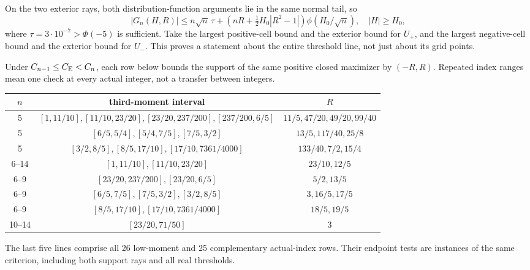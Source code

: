 On the two exterior rays, both distribution-function arguments lie
in the same normal tail, so
\[
 |G_n(H,R)|\le n\sqrt n\,\tau+
 \left(nR+\tfrac12H_0|R^2-1|\right)\phi(H_0/\sqrt n),
 \quad |H|\ge H_0,
\]
where $\tau=3\cdot10^{-7}>\Phi(-5)$ is sufficient.
Take the largest positive-cell bound and the exterior bound for
$U_+$, and the largest negative-cell bound and the exterior bound
for $U_-$. This proves a statement about the entire threshold line,
not just about its grid points.



\begin{proposition}\label{j:finite:supportrows}
Under $C_{n-1}\le C_{\mathrm E}<C_n$, each row below bounds the support of the
same positive closed maximizer by $(-R,R)$. Repeated index ranges mean
one check at every actual integer, not a transfer between integers.
\begin{center}\small
\begin{tabular}{c|c|c}
$n$&third-moment interval&$R$\\\hline
5&$[1,11/10],[11/10,23/20],[23/20,237/200],[237/200,6/5]$
 &$11/5,47/20,49/20,99/40$\\
5&$[6/5,5/4],[5/4,7/5],[7/5,3/2]$&$13/5,117/40,25/8$\\
5&$[3/2,8/5],[8/5,17/10],[17/10,7361/4000]$&$133/40,7/2,15/4$\\
6--14&$[1,11/10],[11/10,23/20]$&$23/10,12/5$\\
6--9&$[23/20,237/200],[23/20,6/5]$&$5/2,13/5$\\
6--9&$[6/5,7/5],[7/5,3/2],[3/2,8/5]$&$3,16/5,17/5$\\
6--9&$[8/5,17/10],[17/10,7361/4000]$&$18/5,19/5$\\
10--14&$[23/20,71/50]$&$3$
\end{tabular}
\end{center}
The last five lines comprise all 26 low-moment and 25 complementary
actual-index rows. Their endpoint tests are instances of the same
criterion, including both support rays and all real thresholds.
\end{proposition}
